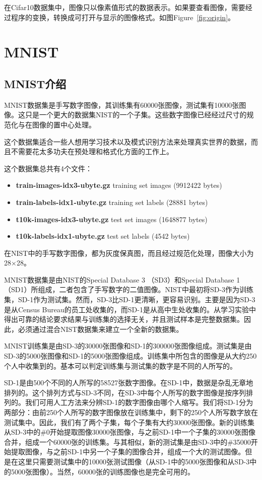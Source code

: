 在Cifar10数据集中，图像只以像素值形式的数据表示。如果要查看图像，需要经过程序的变换，转换成可打开与显示的图像格式。如图Figure~\ref{fig:origin}。



\section{MNIST}
\subsection{MNIST介绍}
MNIST数据集是手写数字图像，其训练集有60000张图像，测试集有10000张图像。这只是一个更大的数据集NIST的一个子集。这些数字图像已经经过尺寸的规范化与在图像的置中心处理。

这个数据集适合一些人想用学习技术以及模式识别方法来处理真实世界的数据，而且不需要花太多功夫在预处理和格式化方面的工作上。

这个数据集总共有4个文件：
\begin{itemize}
\item \textbf{{\footnotesize{train-images-idx3-ubyte.gz}}} {\footnotesize{training set images (9912422 bytes)}} 
\item \textbf{{\footnotesize{train-labels-idx1-ubyte.gz}}} {\footnotesize{training set labels (28881 bytes)}} 
\item \textbf{{\footnotesize{t10k-images-idx3-ubyte.gz}}} {\footnotesize{test set images (1648877 bytes)}} 
\item \textbf{{\footnotesize{t10k-labels-idx1-ubyte.gz}}} {\footnotesize{test set labels (4542 bytes)}}
\end{itemize}

在NIST中的手写数字图像，都为灰度保真图，而且经过规范化处理，图像大小为28$\times$28。

MNIST数据集是由NIST的Special Database 3 （SD3）和Special Database 1（SD1）所组成，二者包含了手写数字的二值图像。NIST中最初将SD-3作为训练集，SD-1作为测试集。然而，SD-3比SD-1更清晰，更容易识别。主要是因为SD-3是从Census Bureau的员工处收集的，而SD-1是从高中生处收集的。从学习实验中得出可靠的结论要求结果与训练集的选择无关，并且测试样本是完整数据集。因此，必须通过混合NIST数据集来建立一个全新的数据集。

MNIST训练集是由SD-3的30000张图像和SD-1的300000张图像组成。测试集是由SD-3的5000张图像和SD-1的5000张图像组成。训练集中所包含的图像是从大约250个人中收集到的。基本可以判定训练集与测试集的数字是不同的人所写的。

SD-1是由500个不同的人所写的58527张数字图像。在SD-1中，数据是杂乱无章地排列的。这个排列方式与SD-3不同，在SD-3中每个人所写的数字图像是按序列排列的。我们可用人工方法来分辨SD-1的数字图像由哪个人缩写。我们将SD-1分为两部分：由前250个人所写的数字图像放在训练集中，剩下的250个人所写数字放在测试集中。因此，我们有了两个子集，每个子集有大约30000张图像。新的训练集从SD-3中的\#0开始提取图像30000张图像，与之前SD-1中一个子集的30000张图像合并，组成一个60000张的训练集。与其相似，新的测试集是由SD-3中的\#35000开始提取图像，与之前SD-1中另一个子集的图像合并，组成一个大的测试图像。但是在这里只需要测试集中的10000张测试图像（从SD-1中的5000张图像和从SD-3中的5000张图像）。当然，60000张的训练图像也是完全可用的。


